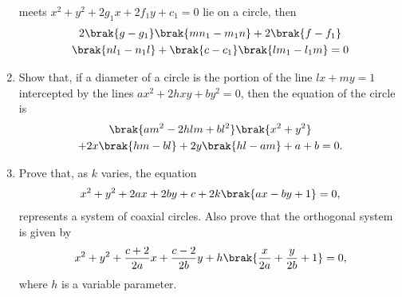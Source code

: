 \begin{enumerate}[1.]
 meets $x^2 +y^2+2g_1x+2f_1y+c_1=0$ lie on a circle,
 then 
 \begin{multline*}
 2\brak{g-g_1}\brak{mn_1-m_1n}+2\brak{f-f_1}
 \\
 \brak{nl_1-n_1l}+\brak{c-c_1}\brak{lm_1-l_1m}=0
 \end{multline*}
 \item Show that, if a diameter of a circle is the portion of the line $lx+my=1$ intercepted by the lines $ax^2+2hxy+by^2=0$, then the 
 equation of the circle is
 \begin{multline*}
\brak{am^2-2hlm+bl^2} \brak{x^2+ y^2}
\\
+ 2x\brak{hm-bl} + 2y\brak{hl-am} + a+b =0.
 \end{multline*}
\item Prove that, as $k$ varies, the equation
 \begin{align*}
 x^2 + y^2 +2ax +2by + c + 2k\brak{ax-by+1} =0,
 \end{align*}
 represents a system of coaxial circles.  Also prove that the orthogonal system is given by
 \begin{align*}
 x^2 +y^2 +\frac{c+2}{2a} x + \frac{c-2}{2b} y +h\brak{\frac{x}{2a}+\frac{y}{2b} + 1}=0,
 \end{align*}
 where $h$ is a variable parameter.
\end{enumerate}